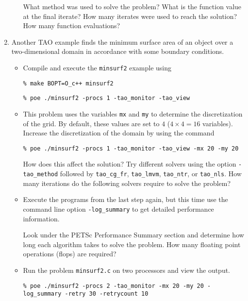 \documentclass[11pt]{article}
\begin{document}
\begin{enumerate}
\begin{itemize}
  What method was used to solve the problem?
  What is the function value at the final iterate?
  How many iterates were used to reach the solution?
  How many function evaluations?

 \newpage

\end{itemize}

\item
Another TAO example finds the minimum surface area of an object over a
two-dimensional domain in accordance with some boundary conditions.

\begin{itemize}

\item
Compile and execute the \texttt{minsurf2} example using

\texttt{\% make BOPT=O\_c++ minsurf2}

\texttt{\% poe ./minsurf2 -procs 1 -tao\_monitor -tao\_view}

\item
This problem uses the variables {\tt mx} and {\tt my} to determine
the discretization of the grid.  By default, these values are set to
$4$ ($4 \times 4 = 16$ variables). Increase the discretization of the
domain by using the command

\texttt{\% poe ./minsurf2 -procs 1 -tao\_monitor -tao\_view -mx 20 -my 20}

How does this affect the solution?
Try different solvers using the option \texttt{-tao\_method} followed by
\texttt{tao\_cg\_fr},
\texttt{tao\_lmvm}, \texttt{tao\_ntr}, or \texttt{tao\_nls}.
How many iterations do the following solvers require to solve the problem?


\item
Execute the programs from the last step again, but this time use the command line option
\texttt{-log\_summary} to get detailed performance information.

Look under the PETSc Performance Summary section and determine how long
each algorithm takes to solve the problem. How many floating point operations (flops) are required?


\item
Run the problem \texttt{minsurf2.c} on two processors and view the output.

\texttt{\% poe ./minsurf2 -procs 2 -tao\_monitor -mx 20 -my 20 -log\_summary -retry 30 -retrycount 10}

\end{itemize}


\end{enumerate}
\end{document}
